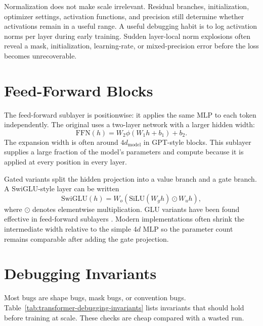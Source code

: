 Normalization does not make scale irrelevant. Residual branches, initialization, optimizer settings, activation functions, and precision still determine whether activations remain in a useful range. A useful debugging habit is to log activation norms per layer during early training. Sudden layer-local norm explosions often reveal a mask, initialization, learning-rate, or mixed-precision error before the loss becomes unrecoverable.

\section{Feed-Forward Blocks}
\label{sec:feed-forward-blocks}

The feed-forward sublayer is positionwise: it applies the same MLP to each token independently. The original \transformer uses a two-layer network with a larger hidden width:
\begin{equation}
  \mathrm{FFN}(h) = W_2 \phi(W_1 h + b_1) + b_2.
\end{equation}
The expansion width is often around $4d_{\mathrm{model}}$ in GPT-style blocks. This sublayer supplies a large fraction of the model's parameters and compute because it is applied at every position in every layer.

Gated variants split the hidden projection into a value branch and a gate branch. A SwiGLU-style layer can be written
\begin{equation}
  \mathrm{SwiGLU}(h) =
  W_o(\mathrm{SiLU}(W_g h) \odot W_u h),
\end{equation}
where $\odot$ denotes elementwise multiplication. GLU variants have been found effective in \transformer feed-forward sublayers \cite{shazeer2020glu}. Modern implementations often shrink the intermediate width relative to the simple $4d$ MLP so the parameter count remains comparable after adding the gate projection.

\section{Debugging Invariants}
\label{sec:debugging-invariants}

Most \transformer bugs are shape bugs, mask bugs, or convention bugs. Table~\ref{tab:transformer-debugging-invariants} lists invariants that should hold before training at scale. These checks are cheap compared with a wasted run.

